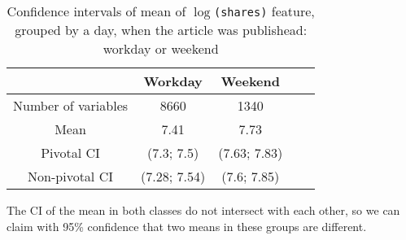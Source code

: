 \begin{table}
\caption{Confidence intervals of mean of \texttt{$\log$(shares)} feature, grouped by a day, when the article was publishead: workday or weekend} \label{tbl:workday_weekend_log_shares_CIs}
\begin{center}
\begin{tabular}{|c|c|c|c|c|} 
 \hline
 & Workday & Weekend \\ \hline
Number of variables &  8660 & 1340 \\ \hline
Mean & 7.41 & 7.73 \\ \hline
Pivotal CI & (7.3; 7.5) & (7.63; 7.83)\\ \hline
Non-pivotal CI & (7.28; 7.54) & (7.6; 7.85)\\ \hline 
\end{tabular}
\end{center}
\end{table}

The CI of the mean in both classes do not intersect with each other, so we can claim with 95\% confidence that two means in these groups  are different.
